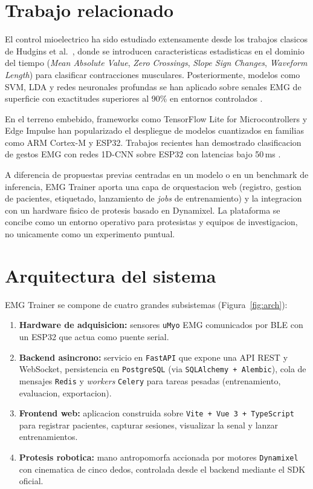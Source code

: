\documentclass[11pt,a4paper]{article}
\begin{document}
\section{Trabajo relacionado}
\label{sec:related}

El control mioelectrico ha sido estudiado extensamente desde los
trabajos clasicos de Hudgins et al.\ \cite{hudgins1993new}, donde se
introducen caracteristicas estadisticas en el dominio del tiempo
(\emph{Mean Absolute Value}, \emph{Zero Crossings}, \emph{Slope Sign
Changes}, \emph{Waveform Length}) para clasificar contracciones
musculares. Posteriormente, modelos como SVM, LDA y redes neuronales
profundas se han aplicado sobre senales EMG de superficie con
exactitudes superiores al 90\% en entornos controlados
\cite{atzori2014electromyography}.

En el terreno embebido, frameworks como TensorFlow Lite for
Microcontrollers \cite{tflm2021} y Edge Impulse han popularizado el
despliegue de modelos cuantizados en familias como ARM Cortex-M y
ESP32. Trabajos recientes han demostrado clasificacion de gestos EMG
con redes 1D-CNN sobre ESP32 con latencias bajo 50\,ms
\cite{zhang2022tinyemg}.

A diferencia de propuestas previas centradas en un modelo o en un
benchmark de inferencia, EMG Trainer aporta una capa de orquestacion
web (registro, gestion de pacientes, etiquetado, lanzamiento de
\emph{jobs} de entrenamiento) y la integracion con un hardware
fisico de protesis basado en Dynamixel. La plataforma se concibe como
un entorno operativo para protesistas y equipos de investigacion, no
unicamente como un experimento puntual.

\section{Arquitectura del sistema}
\label{sec:arch}

EMG Trainer se compone de cuatro grandes subsistemas
(Figura~\ref{fig:arch}):

\begin{enumerate}
  \item \textbf{Hardware de adquisicion:} sensores \texttt{uMyo} EMG
        comunicados por BLE con un ESP32 que actua como puente serial.
  \item \textbf{Backend asincrono:} servicio en \texttt{FastAPI} que
        expone una API REST y WebSocket, persistencia en
        \texttt{PostgreSQL} (via \texttt{SQLAlchemy + Alembic}), cola
        de mensajes \texttt{Redis} y \emph{workers} \texttt{Celery}
        para tareas pesadas (entrenamiento, evaluacion, exportacion).
  \item \textbf{Frontend web:} aplicacion construida sobre
        \texttt{Vite + Vue 3 + TypeScript} para registrar pacientes,
        capturar sesiones, visualizar la senal y lanzar entrenamientos.
  \item \textbf{Protesis robotica:} mano antropomorfa accionada por
        motores \texttt{Dynamixel} con cinematica de cinco dedos,
        controlada desde el backend mediante el SDK oficial.
\end{enumerate}
\end{document}

